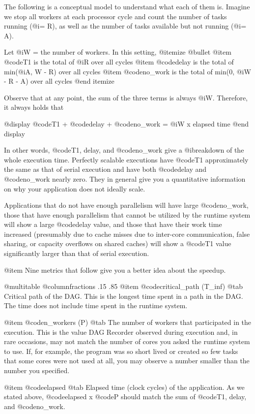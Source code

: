 The following is a conceptual model to understand what each of them is.
Imagine we stop all workers at each processor cycle and count the number
of tasks running (@i{= R}), as well as the number of tasks available but
not running (@i{= A}).

Let @i{W =} the number of workers.  In this setting,
@itemize @bullet
@item @code{T1} is the total of @i{R} over all cycles
@item @code{delay} is the total of min(@i{A, W - R}) over all cycles
@item @code{no_work} is the total of min(0, @i{W - R - A}) over all cycles
@end itemize

Observe that at any point, the sum of the three terms is always @i{W}.
Therefore, it always holds that 

@display
@code{T1} + @code{delay} + @code{no_work} = @i{W} x elapsed time
@end display

In other words, @code{T1, delay}, and @code{no_work} give a
@i{breakdown} of the whole execution time.  Perfectly scalable
executions have @code{T1} approximately the same as that of serial
execution and have both @code{delay} and @code{no_work} nearly zero.
They in general give you a quantitative information on why your
application does not ideally scale.

Applications that do not have enough parallelism will have large
@code{no_work}, those that have enough parallelism that cannot
be utilized by the runtime system will show a large @code{delay} value,
and those that have their work time increased (presumably due to
cache misses due to inter-core communication, false sharing, or 
capacity overflows on shared caches) will show a @code{T1} value
significantly larger than that of serial execution.

@item Nine metrics that follow give you a better idea about the
speedup.

@multitable @columnfractions .15 .85
@item @code{critical_path (T_inf)} @tab Critical path of the DAG.  This
is the longest time spent in a path in the DAG.  The time does not
include time spent in the runtime system.

@item @code{n_workers (P)} @tab
The number of workers that participated in the execution.  This is
the value DAG Recorder observed during execution and, in rare occasions,
may not match the number of cores you asked the runtime system to use.
If, for example, the program was so short lived or created so few tasks
that some cores were not used at all, you may observe a number smaller than
the number you specified.

@item @code{elapsed} @tab
Elapsed time (clock cycles) of the application.
As we stated above, @code{elapsed} x @code{P} should match the sum
of @code{T1, delay,} and @code{no_work}.

